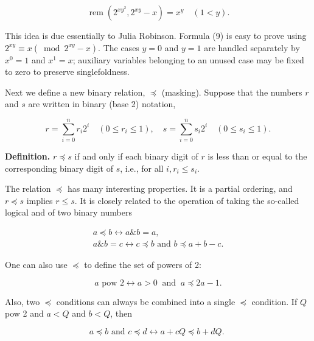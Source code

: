 \documentclass[11pt,leqno]{article}
\newcommand{\origpage}[1]{\marginnote{\footnotesize\textbf{[#1]}}}
\begin{document}
\begin{equation*}
\operatorname{rem}\left(2^{x y^{2}}, 2^{x y}-x\right)=x^{y} \quad(1<y) . \tag{9}\label{eq:9}
\end{equation*}

\origpage{821}This idea is due essentially to Julia Robinson. Formula (9) is easy to prove using $2^{x y} \equiv x\left(\bmod 2^{x y}-x\right)$. The cases $y=0$ and $y=1$ are handled separately by $x^0=1$ and $x^1=x$; auxiliary variables belonging to an unused case may be fixed to zero to preserve singlefoldness.

Next we define a new binary relation, $\preccurlyeq$ (masking). Suppose that the numbers $r$ and $s$ are written in binary (base 2) notation,

$$
r=\sum_{i=0}^{n} r_{i} 2^{i} \quad\left(0 \leq r_{i} \leq 1\right), \quad s=\sum_{i=0}^{n} s_{i} 2^{i} \quad\left(0 \leq s_{i} \leq 1\right) .
$$

\medskip\noindent\textbf{Definition.} $r \preccurlyeq s$ if and only if each binary digit of $r$ is less than or equal to the corresponding binary digit of $s$, i.e., for all $i, r_{i} \leq s_{i}$.

The relation $\preccurlyeq$ has many interesting properties. It is a partial ordering, and $r \preccurlyeq s$ implies $r \leq s$. It is closely related to the operation of taking the so-called logical and of two binary numbers

\begin{gather*}
a \preccurlyeq b \leftrightarrow a\mathbin{\&}b=a,  \tag{10}\label{eq:10}\\
a\mathbin{\&}b=c \leftrightarrow c \preccurlyeq b \text { and } b \preccurlyeq a+b-c . \tag{11}\label{eq:11}
\end{gather*}

One can also use $\preccurlyeq$ to define the set of powers of 2:

\begin{equation*}
a \text { pow } 2 \leftrightarrow a>0\ \text{ and }\ a \preccurlyeq 2 a-1 . \tag{12}\label{eq:12}
\end{equation*}

Also, two $\preccurlyeq$ conditions can always be combined into a single $\preccurlyeq$ condition. If $Q$ pow 2 and $a<Q$ and $b<Q$, then

\begin{equation*}
a \preccurlyeq b \text { and } c \preccurlyeq d \leftrightarrow a+c Q \preccurlyeq b+d Q \text {. } \tag{13}\label{eq:13}
\end{equation*}
\end{document}
